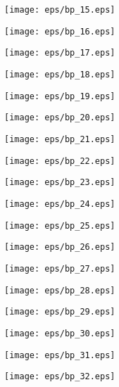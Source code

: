 \documentclass{book}
\begin{document}
	\clearpage\begin{figure}[p]
    \centering
	\texttt{[image: eps/bp\_15.eps]}
	\end{figure}
	\clearpage\begin{figure}[p]
    \centering
	\texttt{[image: eps/bp\_16.eps]}
	\end{figure}
	\clearpage\begin{figure}[p]
    \centering
	\texttt{[image: eps/bp\_17.eps]}
	\end{figure}
	\clearpage\begin{figure}[p]
    \centering
	\texttt{[image: eps/bp\_18.eps]}
	\end{figure}
	\clearpage\begin{figure}[p]
    \centering
	\texttt{[image: eps/bp\_19.eps]}
	\end{figure}
	\clearpage\begin{figure}[p]
    \centering
	\texttt{[image: eps/bp\_20.eps]}
	\end{figure}
	\clearpage\begin{figure}[p]
    \centering
	\texttt{[image: eps/bp\_21.eps]}
	\end{figure}
	\clearpage\begin{figure}[p]
    \centering
	\texttt{[image: eps/bp\_22.eps]}
	\end{figure}
	\clearpage\begin{figure}[p]
    \centering
	\texttt{[image: eps/bp\_23.eps]}
	\end{figure}
	\clearpage\begin{figure}[p]
    \centering
	\texttt{[image: eps/bp\_24.eps]}
	\end{figure}
	\clearpage\begin{figure}[p]
    \centering
	\texttt{[image: eps/bp\_25.eps]}
	\end{figure}
	\clearpage\begin{figure}[p]
    \centering
	\texttt{[image: eps/bp\_26.eps]}
	\end{figure}
	\clearpage\begin{figure}[p]
    \centering
	\texttt{[image: eps/bp\_27.eps]}
	\end{figure}
	\clearpage\begin{figure}[p]
    \centering
	\texttt{[image: eps/bp\_28.eps]}
	\end{figure}
	\clearpage\begin{figure}[p]
    \centering
	\texttt{[image: eps/bp\_29.eps]}
	\end{figure}
	\clearpage\begin{figure}[p]
    \centering
	\texttt{[image: eps/bp\_30.eps]}
	\end{figure}
	\clearpage\begin{figure}[p]
    \centering
	\texttt{[image: eps/bp\_31.eps]}
	\end{figure}
	\clearpage\begin{figure}[p]
    \centering
	\texttt{[image: eps/bp\_32.eps]}
	\end{figure}
	\clearpage
\end{document}
